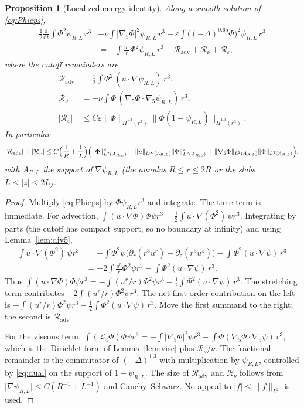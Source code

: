 \documentclass[11pt]{article}
\newtheorem{proposition}[theorem]{Proposition}
\theoremstyle{definition}
\newcommand{\eps}{\varepsilon}
\newcommand{\ddt}{\frac{\mathrm{d}}{\mathrm{d}t}}
\newcommand{\ur}{u^{r}}
\newcommand{\uz}{u^{z}}
\newcommand{\Ph}{\Phi}
\newcommand{\Lfour}{\mathcal{L}_{4}}
\newcommand{\gradfive}{\nabla_{5}}
\newcommand{\Hdot}{\dot{H}}
\newcommand{\norm}[2]{\|#1\|_{#2}}
\newcommand{\abs}[1]{\lvert#1\rvert}
\begin{document}
\begin{proposition}[Localized energy identity]
\label{prop:local}
Along a smooth solution of \eqref{eq:Phieps},
\begin{align}
\label{eq:star-loc}
\tfrac12\ddt\int\Ph^2\psi_{R,L}\,r^3
&+\nu\int\abs{\gradfive\Ph}^2\psi_{R,L}\,r^3
+\eps\int\bigl((-\Delta)^{0.65}\Ph\bigr)^2\psi_{R,L}\,r^3\nonumber\\
&=-\int\frac{\ur}{r}\Ph^2\psi_{R,L}\,r^3
+\mathcal{R}_{\mathrm{adv}}
+\mathcal{R}_{\nu}
+\mathcal{R}_{\eps},
\end{align}
where the cutoff remainders are
\begin{align*}
\mathcal{R}_{\mathrm{adv}}
&=\tfrac12\int\Ph^2\,(u\cdot\nabla\psi_{R,L})\,r^3,\\
\mathcal{R}_{\nu}
&=-\nu\int\Ph\,(\gradfive\Ph\cdot\gradfive\psi_{R,L})\,r^3,\\
\abs{\mathcal{R}_{\eps}}
&\le C\eps\norm{\Ph}{\Hdot^{1.3}(r^3)}
\norm{\Ph(1-\psi_{R,L})}{\Hdot^{1.3}(r^3)}.
\end{align*}
In particular
\[
\abs{\mathcal{R}_{\mathrm{adv}}}
+\abs{\mathcal{R}_{\nu}}
\le C\Bigl(\frac1R+\frac1L\Bigr)
\Bigl(\norm{\Ph}{L^2(A_{R,L})}^2
+\norm{u}{L^\infty(A_{R,L})}\norm{\Ph}{L^2(A_{R,L})}^2
+\norm{\gradfive\Ph}{L^2(A_{R,L})}\norm{\Ph}{L^2(A_{R,L})}\Bigr),
\]
with \(A_{R,L}\) the support of \(\nabla\psi_{R,L}\)
(the annulus \(R\le r\le 2R\) or the slabs \(L\le\abs{z}\le 2L\)).
\end{proposition}

\begin{proof}
Multiply \eqref{eq:Phieps} by \(\Ph\psi_{R,L}r^3\) and integrate.
The time term is immediate.
For advection,
\(\int(u\cdot\nabla\Ph)\Ph\psi r^3
=\tfrac12\int u\cdot\nabla(\Ph^2)\,\psi r^3\).
Integrating by parts (the cutoff has compact support, so no boundary
at infinity) and using Lemma~\ref{lem:div5},
\begin{align*}
\int u\cdot\nabla(\Ph^2)\,\psi r^3
&=-\int\Ph^2\psi\bigl(\partial_r(r^3\ur)+\partial_z(r^3\uz)\bigr)
-\int\Ph^2(u\cdot\nabla\psi)\,r^3\\
&=-2\int\frac{\ur}{r}\Ph^2\psi r^3
-\int\Ph^2(u\cdot\nabla\psi)\,r^3.
\end{align*}
Thus
\(\int(u\cdot\nabla\Ph)\Ph\psi r^3
=-\int(\ur/r)\Ph^2\psi r^3
-\tfrac12\int\Ph^2(u\cdot\nabla\psi)\,r^3\).
The stretching term contributes
\(+2\int(\ur/r)\Ph^2\psi r^3\).
The net first-order contribution on the left is
\(+\int(\ur/r)\Ph^2\psi r^3
-\tfrac12\int\Ph^2(u\cdot\nabla\psi)\,r^3\).
Move the first summand to the right; the second is
\(\mathcal{R}_{\mathrm{adv}}\).

For the viscous term,
\(\int(\Lfour\Ph)\Ph\psi r^3
=-\int\abs{\gradfive\Ph}^2\psi r^3
-\int\Ph(\gradfive\Ph\cdot\gradfive\psi)\,r^3\),
which is the Dirichlet form of Lemma~\ref{lem:visc} plus
\(\mathcal{R}_{\nu}/\nu\).
The fractional remainder is the commutator of
\((-\Delta)^{1.3}\) with multiplication by \(\psi_{R,L}\), controlled
by \eqref{eq:dual} on the support of \(1-\psi_{R,L}\).
The size of \(\mathcal{R}_{\mathrm{adv}}\) and \(\mathcal{R}_{\nu}\)
follows from \(\abs{\nabla\psi_{R,L}}\le C(R^{-1}+L^{-1})\) and Cauchy--Schwarz.
No appeal to \(\abs{f}\le\norm{f}{L^2}\) is used.
\end{proof}
\end{document}
